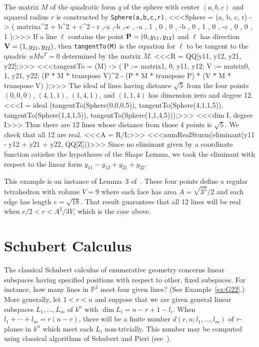 The matrix $M$ of the quadratic form $q$ of the sphere with
center $(a,b,c)$ and squared radius $r$ is constructed by 
{\tt Sphere(a,b,c,r)}.
%
<<<Sphere = (a, b, c, r) -> (
        matrix{{a^2 + b^2 + c^2 - r ,-a ,-b ,-c },
               {         -a         , 1 , 0 , 0 },
               {         -b         , 0 , 1 , 0 },
               {         -c         , 0 , 0 , 1 }}
        );>>>
%
If a line $\ell$ contains the point ${\bf P}=(0,y_{11},y_{12})$ 
and $\ell$ has direction ${\bf V} = (1,y_{21},y_{22})$, then 
{\tt tangentTo(M)} is the equation for $\ell$ to be tangent to the 
quadric $uMu^T=0$ determined by the matrix $M$.
%
<<<R = QQ[y11, y12, y21, y22];>>>
%
<<<tangentTo = (M) -> (
     P := matrix{{1, 0, y11, y12}};
     V := matrix{{0, 1, y21, y22}};
     (P * M * transpose V)^2 - 
       (P * M * transpose P) * (V * M * transpose V)
     );>>>
The ideal of lines having distance $\sqrt{5}$ from the four points
$(0,0,0)$, $(4,1,1)$, $(1,4,1)$, and $(1,1,4)$ has dimension zero and degree 12.
%
<<<I = ideal (tangentTo(Sphere(0,0,0,5)), 
           tangentTo(Sphere(4,1,1,5)), 
           tangentTo(Sphere(1,4,1,5)), 
           tangentTo(Sphere(1,1,4,5)));>>>
%
<<<dim I, degree I>>>
%
Thus there are 12 lines whose distance from those 4 points is $\sqrt{5}$.
We check that all 12 are real.
%
<<<A = R/I;>>>
%
<<<numRealSturm(eliminant(y11 - y12 + y21 + y22, QQ[Z]))>>>
%
Since no eliminant given by a coordinate function satisfies
the hypotheses of the Shape Lemma, 
we took the eliminant with respect to the linear form
$y_{11} - y_{12} + y_{21} + y_{22}$.

This example is an instance of Lemma~3 of~\cite{SO:MPT00}.
These four points define a regular tetrahedron with volume
$V=9$ where each face has area $A=\sqrt{3^5}/2$ and each edge has length
$e=\sqrt{18}$.
That result guarantees that all 12 lines will be real when 
$e/2<r<A^2/3V$, which is the case above.


\section{Schubert Calculus}
The classical Schubert calculus of enumerative
geometry concerns linear subspaces having
specified positions with respect to other, fixed subspaces. 
For instance, how many lines in ${\mathbb P}^3$ meet four given
lines? (See Example~\ref{ex:G22}.) 
More generally, let $1<r<n$ and suppose that we are given general linear
subspaces $L_1,\ldots,L_m$ of $k^n$ with $\dim L_i=n-r+1-l_i$.
When $l_1+\cdots+l_m=r(n-r)$, there will be a finite number
$d(r,n;l_1,\ldots,l_m)$ of $r$-planes in
$k^n$ which meet each $L_i$ non-trivially. 
This number may be computed using classical algorithms of Schubert and Pieri
(see~\cite{SO:MR48:2152}).


